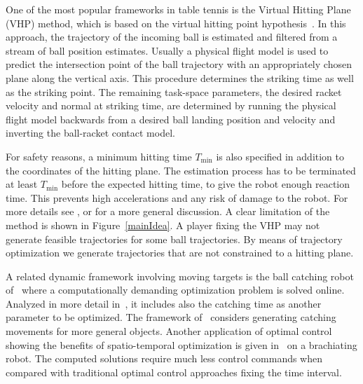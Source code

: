 One of the most popular frameworks in table tennis is the Virtual Hitting Plane (VHP) method, which is based on the virtual hitting point hypothesis~\cite{Ramanantsoa94}. In this approach, the trajectory of the incoming ball is estimated and filtered from a stream of ball position estimates. Usually a physical flight model is used to predict the intersection point of the ball trajectory with an appropriately chosen plane along the vertical axis. This procedure determines the striking time as well as the striking point. The remaining task-space parameters, the desired racket velocity and normal at striking time, are determined by running the physical flight model backwards from a desired ball landing position and velocity and inverting the ball-racket contact model.

For safety reasons, a minimum hitting time $T_{\mathrm{min}}$ is also specified in addition to the coordinates of the hitting plane. The estimation process has to be terminated at least $T_{\mathrm{min}}$ before the expected hitting time, to give the robot enough reaction time. This prevents high accelerations and any risk of damage to the robot. For more details see \cite{Muelling13}, or \cite{Matsushima05} for a more general discussion. A clear limitation of the method is shown in Figure~\ref{mainIdea}. A player fixing the VHP may not generate feasible trajectories for some ball trajectories. By means of trajectory optimization we generate trajectories that are not constrained to a hitting plane.

A related dynamic framework involving moving targets is the ball catching robot of~\cite{Baeuml11} where a computationally demanding optimization problem is solved online. Analyzed in more detail in~\cite{Baeuml10}, it includes also the catching time as another parameter to be optimized. The framework of~\cite{Kim10} considers generating catching movements for more general objects. Another application of optimal control showing the benefits of spatio-temporal optimization is given in~\cite{Nakanishi2016} on a brachiating robot. The computed solutions require much less control commands when compared with traditional optimal control approaches fixing the time interval. 

